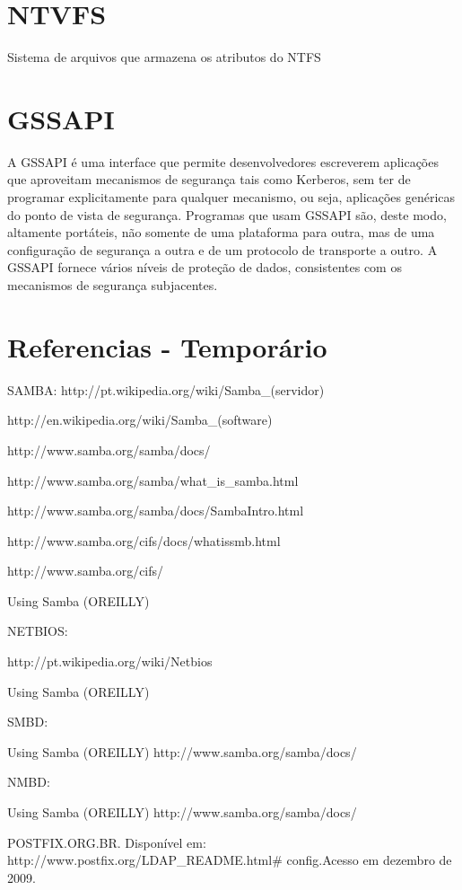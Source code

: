 \section{NTVFS}

Sistema de arquivos que armazena os atributos do NTFS

\section{GSSAPI}

A GSSAPI é uma interface que permite desenvolvedores escreverem aplicações que aproveitam mecanismos de segurança tais como Kerberos, sem ter de programar explicitamente para qualquer mecanismo, ou seja, aplicações genéricas do ponto de vista de segurança. Programas que usam GSSAPI são, deste modo, altamente portáteis, não somente de uma plataforma para outra, mas de uma configuração de segurança a outra e de um protocolo de transporte a outro. A GSSAPI fornece vários níveis de proteção de dados, consistentes com os mecanismos de segurança subjacentes.\cite{HUGO}


\section{Referencias - Temporário}
SAMBA:
http://pt.wikipedia.org/wiki/Samba\_(servidor)

http://en.wikipedia.org/wiki/Samba\_(software)

http://www.samba.org/samba/docs/

http://www.samba.org/samba/what\_is\_samba.html

http://www.samba.org/samba/docs/SambaIntro.html

http://www.samba.org/cifs/docs/what\-is\-smb.html

http://www.samba.org/cifs/

Using Samba (OREILLY)

NETBIOS:

http://pt.wikipedia.org/wiki/Netbios

Using Samba (OREILLY)

SMBD: 

Using Samba (OREILLY)
http://www.samba.org/samba/docs/

NMBD:

Using Samba (OREILLY)
http://www.samba.org/samba/docs/

POSTFIX.ORG.BR. Disponível em: http://www.postfix.org/LDAP\_README.html\# config.Acesso em dezembro de 2009.

